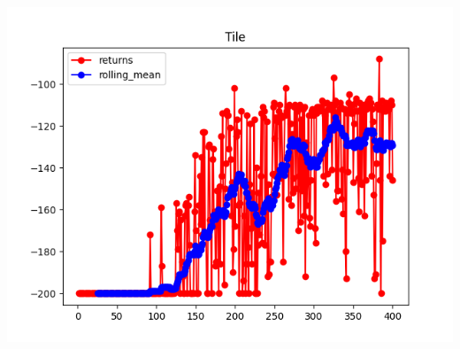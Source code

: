 \documentclass[11pt,addpoints,answers]{exam}
\begin{document}
\begin{questions}
    \begin{your_solution}[title=Plot of Tile,height=10cm,width=15cm]
        \begin{center}
           \includegraphics[scale=0.7]{plots/tile.png}
        \end{center}
    \end{your_solution}
    

\end{questions}
\end{document}

